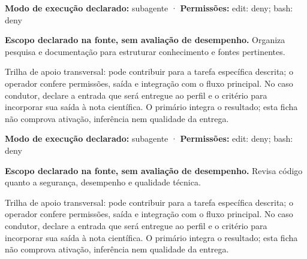 \begin{arquitetura}
\textbf{Modo de execução declarado:} subagente · \textbf{Permissões:} edit: deny; bash: deny
\end{arquitetura}


\begin{descricao}
\textbf{Escopo declarado na fonte, sem avaliação de desempenho.}
Organiza pesquisa e documentação para estruturar conhecimento e fontes pertinentes.
\end{descricao}

\begin{funcao}
Trilha de apoio transversal: pode contribuir para a tarefa específica descrita; o operador confere permissões, saída e integração com o fluxo principal. No caso condutor, declare a entrada que será entregue ao perfil e o critério para incorporar sua saída à nota científica. O primário integra o resultado; esta ficha não comprova ativação, inferência nem qualidade da entrega.
\end{funcao}

\begin{arquitetura}
\textbf{Modo de execução declarado:} subagente · \textbf{Permissões:} edit: deny; bash: deny
\end{arquitetura}


\begin{descricao}
\textbf{Escopo declarado na fonte, sem avaliação de desempenho.}
Revisa código quanto a segurança, desempenho e qualidade técnica.
\end{descricao}

\begin{funcao}
Trilha de apoio transversal: pode contribuir para a tarefa específica descrita; o operador confere permissões, saída e integração com o fluxo principal. No caso condutor, declare a entrada que será entregue ao perfil e o critério para incorporar sua saída à nota científica. O primário integra o resultado; esta ficha não comprova ativação, inferência nem qualidade da entrega.
\end{funcao}


